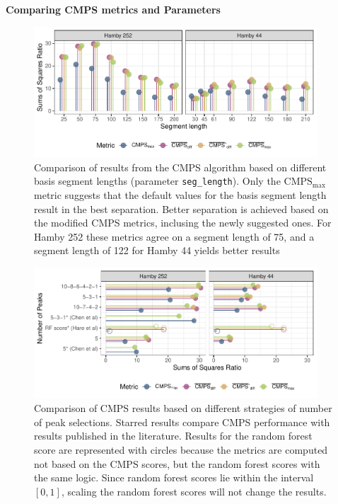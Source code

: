 \textbf{Comparing CMPS metrics and Parameters}

\begin{Schunk}
\begin{figure}

{\centering \includegraphics[width=400px]{ju-hofmann_files/figure-latex/param_seg_plot-1} 

}

\caption{Comparison of results from the CMPS algorithm based on different basis segment lengths (parameter \texttt{seg\_length}). Only the $\mathrm{CMPS_{max}}$ metric suggests that the default values for the basis segment length result in the best separation. Better separation is achieved based on the modified CMPS metrics, inclusing the newly suggested ones. For Hamby 252 these metrics agree on a segment length of 75, and a segment length of 122 for Hamby 44 yields better results}\label{fig:param_seg_plot}
\end{figure}
\end{Schunk}

\begin{Schunk}
\begin{figure}

{\centering \includegraphics[width=400px]{ju-hofmann_files/figure-latex/param_npeak_plot-1} 

}

\caption[Comparison of CMPS results based on different strategies of number of peak selections]{Comparison of CMPS results based on different strategies of number of peak selections. Starred results compare CMPS performance with results published in the literature. Results for the random forest score are represented with circles because the metrics are computed not based on the CMPS scores, but the random forest scores with the same logic. Since random forest scores lie within the interval $[0, 1]$, scaling the random forest scores will not change the results.}\label{fig:param_npeak_plot}
\end{figure}
\end{Schunk}

